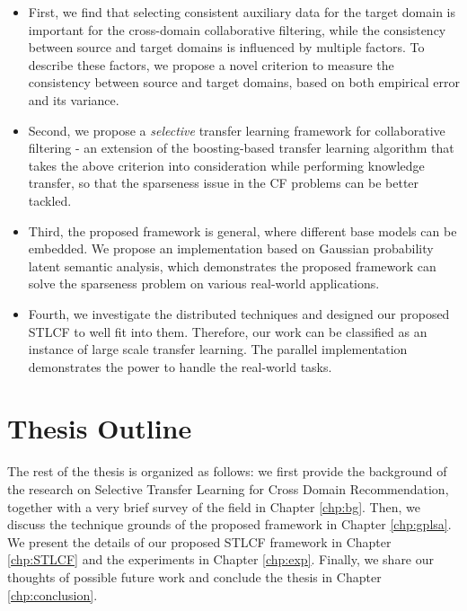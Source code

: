 \begin{itemize}[noitemsep,topsep=0pt,parsep=0pt,partopsep=0pt]
\item First, we find that selecting consistent auxiliary data for the target domain is important for the cross-domain collaborative filtering, while the consistency between source and target domains is influenced by multiple factors. To describe these factors, we propose a novel  criterion to measure the consistency between source and target domains, based on both empirical error and its variance.
\item Second, we propose a {\em selective} transfer learning framework for collaborative filtering - an extension of the boosting-based transfer learning algorithm that takes the above criterion into consideration while performing knowledge transfer, so that the sparseness issue in the CF problems can be better tackled.
\item Third, the proposed framework is general, where different base models can be embedded. We propose an implementation based on Gaussian probability latent semantic analysis, which demonstrates the proposed framework can solve the sparseness problem on various real-world applications.
\item Fourth, we investigate the distributed techniques and designed our proposed STLCF to well fit into them. Therefore, our work can be classified as an instance of large scale transfer learning. The parallel implementation demonstrates the power to handle the real-world tasks.
\end{itemize}

\hspace{0.1in}
\section{Thesis Outline}

The rest of the thesis is organized as follows: we first provide the background of the research on Selective Transfer Learning for Cross Domain Recommendation, together with a very brief survey of the field in Chapter \ref{chp:bg}. Then, we discuss the technique grounds of the proposed framework in Chapter \ref{chp:gplsa}. We present the details of our proposed STLCF framework in Chapter \ref{chp:STLCF} and the experiments in Chapter \ref{chp:exp}. Finally, we share our thoughts of possible future work and conclude the thesis in Chapter \ref{chp:conclusion}.



